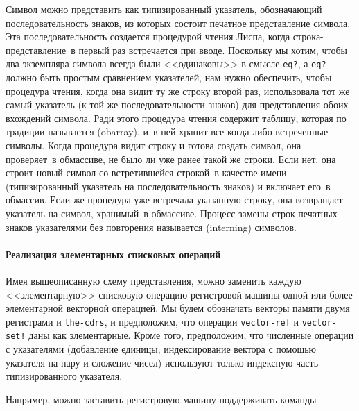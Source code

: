 Символ можно представить как типизированный указатель,
обозначающий последовательность знаков, из которых состоит печатное
представление символа. Эта последовательность создается процедурой
чтения Лиспа, когда строка-представление~в первый раз встречается при вводе.
Поскольку мы хотим, чтобы два экземпляра символа всегда были <<одинаковы>> в
смысле {\tt eq?},
а {\tt eq?} должно быть простым
сравнением указателей, нам нужно обеспечить, чтобы процедура чтения,
когда она видит ту же строку второй раз, использовала тот же самый
указатель (к той же последовательности знаков) для представления обоих
вхождений символа.  Ради этого процедура чтения содержит таблицу,
которая по традиции называется  (obarray),
и~в ней хранит все когда-либо встреченные символы.  Когда процедура
видит строку и готова создать символ, она проверяет~в обмассиве,
не было ли уже ранее такой же строки.  Если нет, она строит новый
символ со встретившейся строкой~в качестве имени (типизированный
указатель на последовательность знаков) и включает его~в обмассив.  Если
же процедура уже встречала указанную строку, она возвращает указатель
на символ, хранимый~в обмассиве.  Процесс замены строк печатных знаков
указателями без повторения называется  
 (interning)
символов.

\paragraph{Реализация элементарных списковых операций}


Имея вышеописанную схему представления, можно заменить
каждую <<элементарную>> списковую операцию регистровой машины одной
или более элементарной векторной операцией.  Мы будем обозначать
векторы памяти двумя регистрами  и
{\tt the-cdrs}, и предположим, что операции
{\tt vector-ref} и {\tt vector-set!} даны как
элементарные.  Кроме того, предположим, что численные операции с
указателями (добавление единицы, индексирование вектора с помощью
указателя на пару и сложение чисел) используют только индексную часть
типизированного указателя.
{\sloppy

}
Например, можно заставить регистровую машину поддерживать
команды

